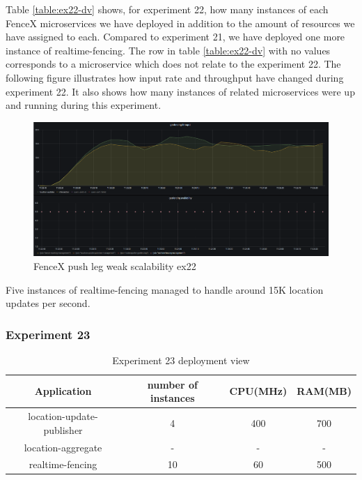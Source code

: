\documentclass[a4]{report}
\begin{document}
    Table \ref{table:ex22-dv} shows, for experiment 22, how many instances of each FenceX microservices we have
    deployed in addition to the amount of resources we have assigned to each.
    Compared to experiment 21, we have deployed one more instance of realtime-fencing.
    The row in table \ref{table:ex22-dv} with no values corresponds to a microservice which does not relate to the
    experiment 22.
    The following figure illustrates how input rate and throughput have changed during experiment 22.
    It also shows how many instances of related microservices were up and running during this experiment.

    \begin{figure}[h!]
        \centering
        \caption{FenceX push leg weak scalability ex22}
        \label{fig:ex22}
        \includegraphics[width=\linewidth, scale=2]{images/evaluation/ex22-benchmarking-ongoing-1per2sec.png}
    \end{figure}
    Five instances of realtime-fencing managed to handle around 15K location updates per second.

    \clearpage

    \subsubsection{Experiment 23}
    \begin{table}[h!]
        \centering
        \begin{tabular}{|c|c|c|c|}
            \hline
            Application               & number of instances & CPU(MHz) & RAM(MB) \\
            \hline
            location-update-publisher & 4                   & 400      & 700     \\
            location-aggregate        & -                   & -        & -       \\
            realtime-fencing          & 10                  & 60       & 500     \\
            \hline
        \end{tabular}
        \caption{Experiment 23 deployment view}
        \label{table:ex23-dv}
    \end{table}
\end{document}
